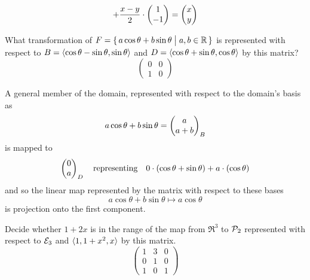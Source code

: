 \begin{exercises}
\begin{answer}
\begin{exparts}
\begin{equation*}
              +\frac{x-y}{2}\cdot\begin{pmatrix} 1 \\ -1 \end{pmatrix}
            =\begin{pmatrix} x \\ y \end{pmatrix}
          \end{equation*}
      \end{exparts}
    \end{answer}
  \item 
    What transformation of
    \( F=\mbox{$\{\,a\cos\theta+b\sin\theta\bigm| a,b\in\mathbb{R}\,\}$} \)
    is represented with respect to
    \( B=\langle\cos\theta-\sin\theta,\sin\theta\rangle \) and
    \( D=\langle\cos\theta+\sin\theta,\cos\theta\rangle \) by this matrix?
    \begin{equation*}
      \begin{pmatrix}
          0  &0  \\
          1  &0
      \end{pmatrix}
    \end{equation*}
    \begin{answer}
      A general member of the domain, represented with respect to the
      domain's basis as
      \begin{equation*}
        a\cos\theta+b\sin\theta=\begin{pmatrix} a \\ a+b \end{pmatrix}_B
      \end{equation*}
      is mapped to 
      \begin{equation*}
        \begin{pmatrix} 0 \\ a \end{pmatrix}_D
          \quad\text{representing}\quad
        0\cdot(\cos\theta+\sin\theta)+a\cdot(\cos\theta)
      \end{equation*}
      and so the linear map represented by the matrix with respect to these
      bases 
      \begin{equation*}
        a\cos\theta+b\sin\theta  
            \mapsto
        a\cos\theta
      \end{equation*}
      is projection onto the first component.  
    \end{answer}
  \recommended \item  
     Decide whether $1+2x$ is in the range of the map from $\Re^3$ to 
     $\mathcal{P}_2$ represented with respect to ${\cal E}_3$ and 
     $\langle1,1+x^2,x\rangle$ by this matrix.
     \begin{equation*}
       \begin{pmatrix}
         1  &3  &0  \\
         0  &1  &0  \\
         1  &0  &1
       \end{pmatrix}

\end{equation*}
\end{exercises}
